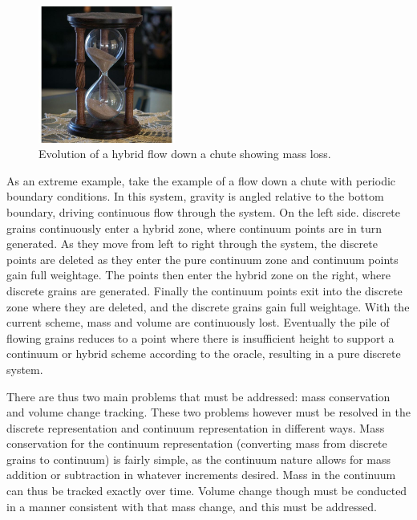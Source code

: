 \begin{figure}[htp] 
    \centering
    \includegraphics[width=0.4\textwidth]{figs/hourglass_whole.jpg}
    \caption{Evolution of a hybrid flow down a chute showing mass loss.}
    \label{chute_flow_old}
\end{figure}

As an extreme example, take the example of a flow down a chute with periodic boundary conditions. In this system, gravity is angled relative to the bottom boundary, driving continuous flow through the system. On the left side. discrete grains continuously enter a hybrid zone, where continuum points are in turn generated. As they move from left to right through the system, the discrete points are deleted as they enter the pure continuum zone and continuum points gain full weightage. The points then enter the hybrid zone on the right, where discrete grains are generated. Finally the continuum points exit into the discrete zone where they are deleted, and the discrete grains gain full weightage. With the current scheme, mass and volume are continuously lost. Eventually the pile of flowing grains reduces to a point where there is insufficient height to support a continuum or hybrid scheme according to the oracle, resulting in a pure discrete system.

There are thus two main problems that must be addressed: mass conservation and volume change tracking. These two problems however must be resolved in the discrete representation and continuum representation in different ways. Mass conservation for the continuum representation (converting mass from discrete grains to continuum) is fairly simple, as the continuum nature allows for mass addition or subtraction in whatever increments desired. Mass in the continuum can thus be tracked exactly over time. Volume change though must be conducted in a manner consistent with that mass change, and this must be addressed. 

